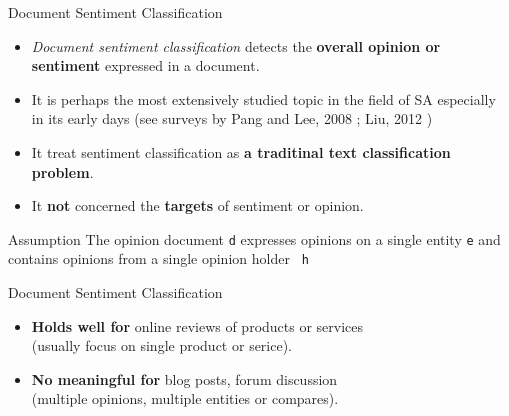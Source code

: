 \documentclass[xcolor=table]{beamer}
\begin{document}
\begin{frame}{Document Sentiment Classification}
    \begin{itemize}
    \item \textit{Document sentiment classification} detects the \textbf{overall opinion or sentiment} expressed in a document.
    \item It is perhaps the most extensively studied topic in the field of SA especially in its early days (see surveys by Pang and Lee, 2008 \cite{pang2008opinion}; Liu, 2012 \cite{liu2012sentiment})
    \item It treat sentiment classification as \textbf{a traditinal text classification problem}.
    \item It \textbf{not} concerned the \textbf{targets} of sentiment or opinion.
    \end{itemize}
    
    \begin{exampleblock}{Assumption}
    The opinion document \texttt{d} expresses opinions on a single entity \texttt{e} and contains opinions from a single opinion holder \texttt{
    h}
    \end{exampleblock}
    
\end{frame}

\begin{frame}{Document Sentiment Classification}
    \begin{itemize}
    \item \textbf{Holds well for} online reviews of products or services \\ (usually focus on single product or serice).
    \item \textbf{No meaningful for} blog posts, forum discussion \\ (multiple opinions, multiple entities or compares).
    \end{itemize}
    
\end{frame}
\end{document}
